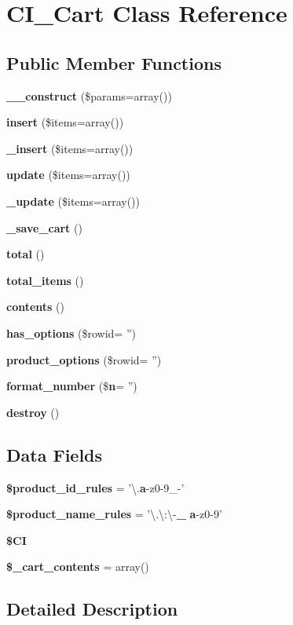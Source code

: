 \section{C\-I\-\_\-\-Cart Class Reference}
\label{class_c_i___cart}
\subsection*{Public Member Functions}
\begin{DoxyCompactItemize}
\item 
{\bf \-\_\-\-\_\-construct} (\$params=array())
\item 
{\bf insert} (\$items=array())
\item 
{\bf \-\_\-insert} (\$items=array())
\item 
{\bf update} (\$items=array())
\item 
{\bf \-\_\-update} (\$items=array())
\item 
{\bf \-\_\-save\-\_\-cart} ()
\item 
{\bf total} ()
\item 
{\bf total\-\_\-items} ()
\item 
{\bf contents} ()
\item 
{\bf has\-\_\-options} (\$rowid= '')
\item 
{\bf product\-\_\-options} (\$rowid= '')
\item 
{\bf format\-\_\-number} (\${\bf n}= '')
\item 
{\bf destroy} ()
\end{DoxyCompactItemize}
\subsection*{Data Fields}
\begin{DoxyCompactItemize}
\item 
{\bf \$product\-\_\-id\-\_\-rules} = '\textbackslash{}.{\bf a}-\/z0-\/9\-\_\--\/'
\item 
{\bf \$product\-\_\-name\-\_\-rules} = '\textbackslash{}.\textbackslash{}\-:\textbackslash{}-\/{\bf \-\_\-} {\bf a}-\/z0-\/9'
\item 
{\bf \$\-C\-I}
\item 
{\bf \$\-\_\-cart\-\_\-contents} = array()
\end{DoxyCompactItemize}


\subsection{Detailed Description}


